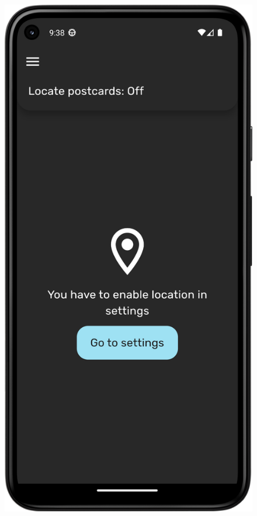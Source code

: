 \documentclass[a4paper,twoside,12pt]{book}
\begin{document}
\begin{figure}[H]
  \centering
  \begin{minipage}[b]{0.49\textwidth}
    \includegraphics[width=\textwidth]{mobile_ss/lokalizacja_pocztowek_wylaczana.png}

\end{minipage}
\end{figure}
\end{document}
